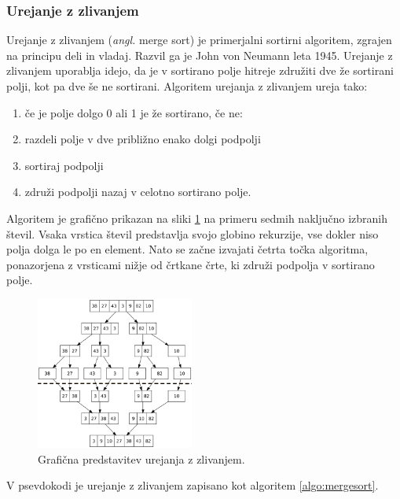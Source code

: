 \documentclass[a4paper,oneside,10pt]{article}
\begin{document}
\subsubsection{Urejanje z zlivanjem}
\label{chapter:mergesort}
Urejanje z zlivanjem (\emph{angl.} merge sort) je primerjalni sortirni algoritem, 
zgrajen na principu deli in vladaj. Razvil ga je John von Neumann leta 1945.
Urejanje z zlivanjem uporablja idejo, da je v sortirano polje hitreje združiti dve že
sortirani polji, kot pa dve še ne sortirani. 
Algoritem urejanja z zlivanjem ureja tako:
\begin{enumerate}
  \item če je polje dolgo 0 ali 1 je že sortirano, če ne:
  \item razdeli polje v dve približno enako dolgi podpolji
  \item sortiraj podpolji 
  \item združi podpolji nazaj v celotno sortirano polje.
\end{enumerate}

Algoritem je grafično prikazan na sliki \ref{fig:mergesortimage} na primeru sedmih
naključno izbranih števil.
Vsaka vrstica števil predstavlja svojo globino rekurzije, vse dokler niso polja dolga le
po en element. Nato se začne izvajati četrta točka algoritma, ponazorjena z vrsticami
nižje od črtkane črte, ki združi podpolja v sortirano polje.

\begin{figure}[h]
    \begin{center}
        \includegraphics[height=50mm]{slike/merge_sort.png}
    \end{center}
    \vspace{-0.7cm}
    \caption[Urejanje z zlivanjem]{Grafična predstavitev urejanja z zlivanjem.}
    \label{fig:mergesortimage}
\end{figure}

V psevdokodi je urejanje z zlivanjem zapisano kot algoritem \ref{algo:mergesort}. 
\end{document}
